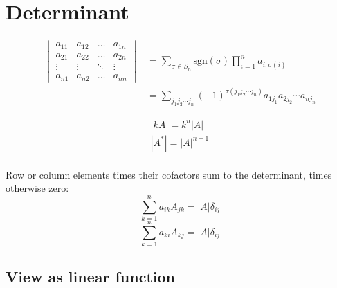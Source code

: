 \documentclass{overview}
\begin{document}
\section{Determinant}

\[
	\begin{aligned}
		\begin{vmatrix}
			a_{11} & a_{12} & \dots & a_{1n} \\
			a_{21} & a_{22} & \dots & a_{2n} \\
			\vdots & \vdots & \ddots & \vdots \\
			a_{n1} & a_{n2} & \dots & a_{nn} 
		\end{vmatrix}
		&= \sum_{\sigma \in S_n} \text{sgn}(\sigma) \prod_{i=1}^n a_{i, \sigma(i)} \\
		&= \sum_{j_1j_2\cdots j_n} (-1)^{\tau(j_1j_2\cdots j_n)} a_{1j_1} a_{2j_2} \cdots a_{nj_n}
	\end{aligned}
\] 

\[
	\begin{aligned}
	|kA| = k^n |A| \\
	|A^{*}| = |A|^{n-1} \\
	\end{aligned}
\] 

Row or column elements times their cofactors sum to the determinant, 
times otherwise zero:
\[
	\sum_{k=1}^{n} a_{ik} A_{jk} = |A| \delta_{ij}
\] 
\[
	\sum_{k=1}^{n} a_{ki} A_{kj} = |A| \delta_{ij}
\] 

\subsection{View as linear function}
\end{document}
